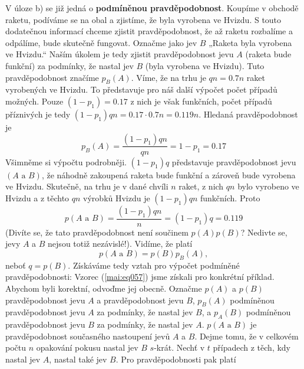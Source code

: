 \begin{example}
    V úloze b) se již jedná o \textbf{podmíněnou pravděpodobnost}. Koupíme v obchodě raketu, 
    podíváme se na obal a zjistíme, že byla vyrobena ve Hvizdu. S touto dodatečnou informací chceme 
    zjistit pravděpodobnost, že až raketu rozbalíme a odpálíme, bude skutečně fungovat. Označme 
    jako jev \(B\) „Raketa byla vyrobena ve Hvizdu.“ Naším úkolem je tedy zjistit pravděpodobnost 
    jevu \(A\) (raketa bude funkční) za podmínky, že nastal jev \(B\) (byla vyrobena ve Hvizdu). 
    Tuto pravděpodobnost značíme \(p_B(A)\). Víme, že na trhu je \(qn = \num{0.7}n\) raket 
    vyrobených ve Hvizdu. To představuje pro náš další výpočet počet případů možných. Pouze \((1 - 
    p_1) = \num{0.17}\) z nich je však funkčních, počet případů příznivých je tedy \((1 - p_1)qn = 
    \num{0.17}\cdot\num{0.7}n = \num{0.119}n\). Hledaná pravděpodobnost je
    \begin{equation*}
      p_B(A) = \dfrac{(1 - p_1)qn}{qn} = 1 - p_1 = \num{0.17}
    \end{equation*}
    Všimněme si výpočtu podrobněji. \((1 - p_1)q\) představuje pravděpodobnost jevu \((A\text{ a 
    }B)\), že náhodně zakoupená raketa bude funkční a zároveň bude vyrobena ve Hvizdu. Skutečně, na 
    trhu je v dané chvíli \(n\) raket, z nich \(qn\) bylo vyrobeno ve Hvizdu a z těchto \(qn\) 
    výrobků Hvizdu je \((1 - p_1)qn\) funkčních. Proto 
    \begin{equation*}
      p(A\text{ a }B) = \dfrac{(1 - p_1)qn}{n} = (1 - p_1)q = \num{0.119}
    \end{equation*}
    (Divíte se, že tato pravděpodobnost není součinem \(p(A)p(B)\)? Nedivte se, jevy \(A\) a \(B\) 
    nejsou totiž nezávislé!). Vidíme, že platí
    \begin{equation*}
      p(A\text{ a }B) = p(B)p_B(A),
    \end{equation*}
    neboť \(q = p(B)\). Získáváme tedy vztah pro výpočet podmíněné pravděpodobnosti:
    Vzorec (\ref{mai:eq057}) jsme získali pro konkrétní příklad. Abychom byli korektní, odvoďme jej 
    obecně. Označme \(p(A)\) a \(p(B)\) pravděpodobnost jevu \(A\) a pravděpodobnost jevu \(B\), 
    \(p_B(A)\) podmíněnou pravděpodobnost jevu \(A\) za podmínky, že nastal jev \(B\), a \(p_A(B)\) 
    podmíněnou pravděpodobnost jevu \(B\) za podmínky, že nastal jev \(A\). \(p(A\text{ a }B)\) je 
    pravděpodobnost současného nastoupení jevů \(A\) a \(B\). Dejme tomu, že v celkovém počtu \(n\) 
    opakování pokusu nastal jev \(B\) \(s\)-krát. Nechť v \(t\) případech z těch, kdy nastal jev 
    \(A\), nastal také jev \(B\). Pro pravděpodobnosti pak platí
    
\normalsize
\end{example}